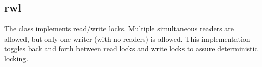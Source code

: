 %
%
%
%
%              

\subsection{rwl}
\label{rwl}

The  class implements read/write locks.  Multiple simultaneous
readers are allowed, but only one writer (with no readers) is allowed.  This
implementation toggles back and forth between read locks and write locks to
assure deterministic locking.

